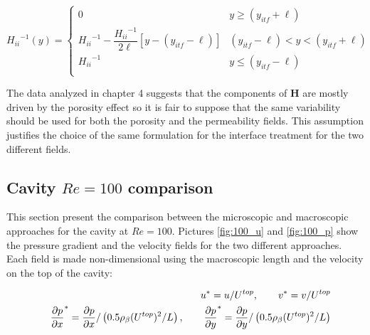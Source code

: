 \begin{equation}
{H_{ii}}^{-1}(y) = 
\begin{cases}
0 & y\geqslant(y_{itf}+\ell) \\
{H_{ii}}^{-1} - \dfrac{{H_{ii}}^{-1}}{2\ell}\left[y -\left(y_{itf} -\ell\right)\right] &  (y_{itf}-\ell)<y<(y_{itf}+\ell)\\
{H_{ii}}^{-1} &y\leqslant(y_{itf}-\ell) \\
\end{cases}
\label{eq:permeability_fun}
\end{equation}

The data analyzed in chapter 4 suggests that the components of $\mathbf{H}$ are mostly driven by the porosity effect so it is fair to suppose that the same variability should be used for both the porosity and the permeability fields. This assumption justifies the choice of the same formulation for the interface treatment for the two different fields.

\subsection{Cavity $Re=100$ comparison}

This section present the comparison between the microscopic and macroscopic approaches for the cavity at $Re=100$. Pictures \ref{fig:100_u} and \ref{fig:100_p} show the pressure gradient and the velocity fields for the two different approaches.
Each field is made non-dimensional using the macroscopic length and the velocity on the top of the cavity:

\begin{eqnarray}
&& u^* = u/{U^{top}}, \qquad v^* = v/{U^{top}} \nonumber \\
&& \dfrac{\partial p}{\partial x}^* = \dfrac{\partial p}{\partial x} / \left(0.5 \rho_{\beta} {(U^{top})^2} /L  \right), \qquad \dfrac{\partial p}{\partial y}^* = \dfrac{\partial p}{\partial y} / \left(0.5 \rho_{\beta} {(U^{top})^2} /L  \right) \nonumber
\end{eqnarray}


